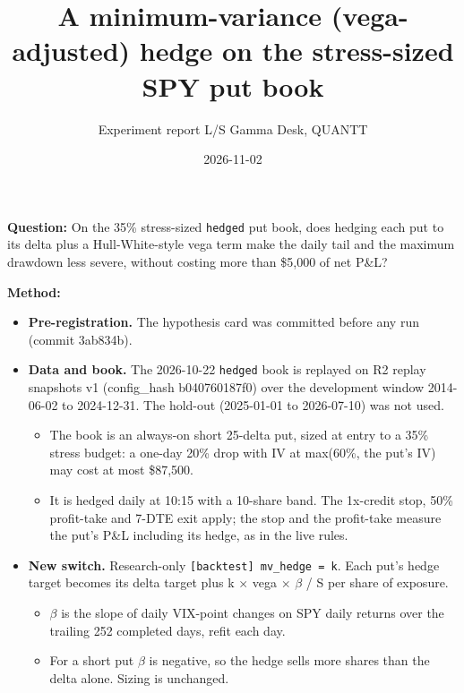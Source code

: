 \documentclass{article}
\title{A minimum-variance (vega-adjusted) hedge on the stress-sized SPY put book}
\author{Experiment report \textperiodcentered{} L/S Gamma Desk, QUANTT}
\date{2026-11-02}
\begin{document}
\maketitle

\textbf{Question:} On the 35\% stress-sized \texttt{hedged} put book, does hedging each put to its delta plus a Hull-White-style vega term make the daily tail and the maximum drawdown less severe, without costing more than \$5,000 of net P\&L?

\textbf{Method:}

\begin{itemize}

\item \textbf{Pre-registration.} The hypothesis card was committed before any run (commit 3ab834b).

\item \textbf{Data and book.} The 2026-10-22 \texttt{hedged} book is replayed on R2 replay snapshots v1 (config\_hash b040760187f0) over the development window 2014-06-02 to 2024-12-31. The hold-out (2025-01-01 to 2026-07-10) was not used.

\begin{itemize}

\item The book is an always-on short 25-delta put, sized at entry to a 35\% stress budget: a one-day 20\% drop with IV at max(60\%, the put's IV) may cost at most \$87,500.

\item It is hedged daily at 10:15 with a 10-share band. The 1x-credit stop, 50\% profit-take and 7-DTE exit apply; the stop and the profit-take measure the put's P\&L including its hedge, as in the live rules.

\end{itemize}

\item \textbf{New switch.} Research-only \texttt{[backtest] mv\_\allowbreak{}hedge = k}. Each put's hedge target becomes its delta target plus k \ensuremath{\times} vega \ensuremath{\times} \ensuremath{\beta} /\allowbreak{} S per share of exposure.

\begin{itemize}

\item \ensuremath{\beta} is the slope of daily VIX-point changes on SPY daily returns over the trailing 252 completed days, refit each day.

\item For a short put \ensuremath{\beta} is negative, so the hedge sells more shares than the delta alone. Sizing is unchanged.


\end{itemize}
\end{itemize}
\end{document}
